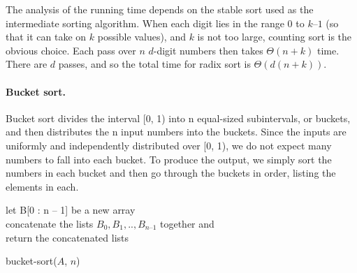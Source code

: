 The analysis of the running time depends on the stable sort used as the intermediate sorting algorithm. When each digit lies in the range $0$ to $k – 1$ (so that it can take on $k$ possible values), and $k$ is not too large, counting sort is the obvious choice. Each pass over $n$ $d$-digit numbers then takes $\Theta(n + k)$ time. There are $d$ passes, and so the total time for radix sort is $\Theta\left(d(n + k)\right)$.

\paragraph{Bucket sort.} %
Bucket sort divides the interval [0, 1) into n equal-sized subintervals, or buckets, and then distributes the n input numbers into the buckets. Since the inputs are uniformly and independently distributed over [0, 1), we do not expect many numbers to fall into each bucket. To produce the output, we simply sort the numbers in each bucket and then go through the buckets in order, listing the elements in each.

  \begin{algorithm}
    	let B[0 : n – 1] be a new array \\
	\For{ $i \leftarrow [1, n]$}{
	    insert $A_{i}$ into list $B_{ \lfloor n A_{i} \rfloor} ]$
       	}
	concatenate the lists $B_{0}, B_{1}, .. , B_{n – 1}$ together and\\
	return the concatenated lists
\caption{bucket-sort($A$, $n$)}
  \end{algorithm}



